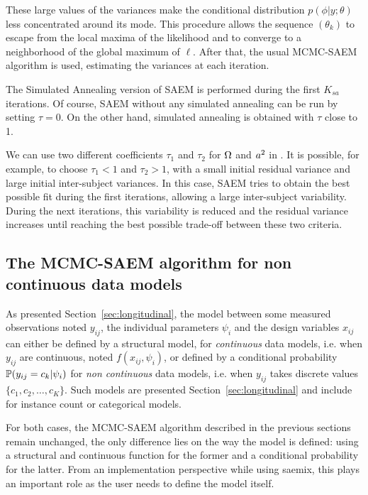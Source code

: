 These large values of the variances make the conditional distribution $p(\phi|y;\theta )$ less concentrated around its mode. This procedure allows the sequence $(\theta_k)$ to escape from the local maxima of the likelihood and to converge to a neighborhood of the global maximum of $\ell$. After that, the usual MCMC-SAEM algorithm is used, estimating the variances at each iteration.


 The Simulated Annealing version of SAEM is performed during the first $K_{sa}$ iterations. Of course, SAEM without any simulated annealing can be run by setting $\tau=0$. On the other hand, simulated annealing is obtained with $\tau$ close to 1.

 We can use two different coefficients $\tau_1$ and $\tau_2$ for ${\Omega}$ and $a^2$ in \monolix. It is possible, for example, to choose $\tau_1<1$ and $\tau_2>1$, with a small initial residual variance and large initial inter-subject variances. In this case, SAEM tries to obtain the best possible fit during the first iterations, allowing a large inter-subject variability. During the next iterations, this variability is reduced and the residual variance increases until reaching the best possible trade-off between these two criteria.

\subsection{The MCMC-SAEM algorithm for non continuous data models}

As presented Section~\ref{sec:longitudinal}, the model between some measured observations noted $y_{ij}$, the individual parameters $\psi_i$ and the design variables $x_{ij}$ can either be defined by a structural model, for \emph{continuous} data models, i.e. when $y_{ij}$ are continuous, noted $f(x_{ij}, \psi_i)$, or defined by a conditional probability $\mathbb{P}(y_{ij}=c_k|\psi_i)$ for \emph{non continuous} data models, i.e. when $y_{ij}$ takes discrete values $\{c_1, c_2,\ldots , c_K\}$. Such models are presented Section~\ref{sec:longitudinal} and include for instance count or categorical models.

For both cases, the MCMC-SAEM algorithm described in the previous sections remain unchanged, the only difference lies on the way the model is defined: using a structural and continuous function for the former and a conditional probability for the latter. From an implementation perspective while using saemix, this plays an important role as the user needs to define the model itself.

